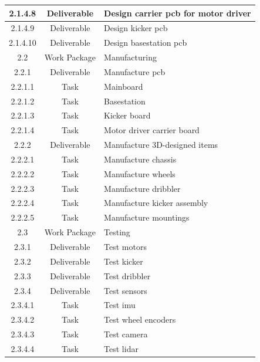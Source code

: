 \begin{longtable}{|c|c|m{}|}
    \rowcolor{c2-d} 2.1.4.8 & Deliverable & Design carrier \acs{pcb} for motor driver\\ \hline
    \rowcolor{c2-d} 2.1.4.9 & Deliverable & Design kicker \acs{pcb} \\ \hline
    \rowcolor{c2-d} 2.1.4.10 & Deliverable & Design basestation \acs{pcb} \\ \hline
    \rowcolor{c2-wp} 2.2 & Work Package & Manufacturing \\ \hline
    \rowcolor{c2-d} 2.2.1 & Deliverable & Manufacture \acs{pcb} \\ \hline
    \rowcolor{c2-t} 2.2.1.1 & Task & Mainboard \\ \hline
    \rowcolor{c2-t} 2.2.1.2 & Task & Basestation \\ \hline
    \rowcolor{c2-t} 2.2.1.3 & Task & Kicker board \\ \hline
    \rowcolor{c2-t} 2.2.1.4 & Task & Motor driver carrier board \\ \hline
    \rowcolor{c2-d} 2.2.2 & Deliverable & Manufacture 3D-designed items \\ \hline
    \rowcolor{c2-t} 2.2.2.1 & Task & Manufacture chassis \\ \hline
    \rowcolor{c2-t} 2.2.2.2 & Task & Manufacture wheels \\ \hline
    \rowcolor{c2-t} 2.2.2.3 & Task & Manufacture dribbler \\ \hline
    \rowcolor{c2-t} 2.2.2.4 & Task & Manufacture kicker assembly \\ \hline
    \rowcolor{c2-t} 2.2.2.5 & Task & Manufacture mountings \\ \hline
    \rowcolor{c2-wp} 2.3 & Work Package & Testing \\ \hline
    \rowcolor{c2-d} 2.3.1 & Deliverable & Test motors \\ \hline
    \rowcolor{c2-d} 2.3.2 & Deliverable & Test kicker \\ \hline
    \rowcolor{c2-d} 2.3.3 & Deliverable & Test dribbler \\ \hline
    \rowcolor{c2-d} 2.3.4 & Deliverable & Test sensors \\ \hline
    \rowcolor{c2-t} 2.3.4.1 & Task & Test \acs{imu} \\ \hline
    \rowcolor{c2-t} 2.3.4.2 & Task & Test wheel encoders \\ \hline
    \rowcolor{c2-t} 2.3.4.3 & Task & Test camera \\ \hline
    \rowcolor{c2-t} 2.3.4.4 & Task & Test \acs{lidar} \\ \hline

\end{longtable}
